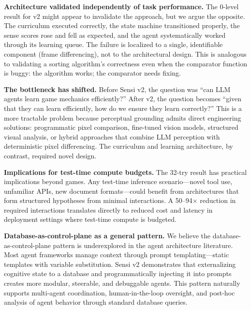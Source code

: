 \documentclass[11pt,letterpaper]{article}
\begin{document}
\textbf{Architecture validated independently of task performance.} The 0-level result for v2 might appear to invalidate the approach, but we argue the opposite. The curriculum executed correctly, the state machine transitioned properly, the sense scores rose and fell as expected, and the agent systematically worked through its learning queue. The failure is localized to a single, identifiable component (frame differencing), not to the architectural design. This is analogous to validating a sorting algorithm's correctness even when the comparator function is buggy: the algorithm works; the comparator needs fixing.

\textbf{The bottleneck has shifted.} Before Sensi v2, the question was ``can LLM agents learn game mechanics efficiently?'' After v2, the question becomes ``given that they can learn efficiently, how do we ensure they learn correctly?'' This is a more tractable problem because perceptual grounding admits direct engineering solutions: programmatic pixel comparison, fine-tuned vision models, structured visual analysis, or hybrid approaches that combine LLM perception with deterministic pixel differencing. The curriculum and learning architecture, by contrast, required novel design.

\textbf{Implications for test-time compute budgets.} The 32-try result has practical implications beyond games. Any test-time inference scenario---novel tool use, unfamiliar APIs, new document formats---could benefit from architectures that form structured hypotheses from minimal interactions. A 50--94$\times$ reduction in required interactions translates directly to reduced cost and latency in deployment settings where test-time compute is budgeted.

\textbf{Database-as-control-plane as a general pattern.} We believe the database-as-control-plane pattern is underexplored in the agent architecture literature. Most agent frameworks manage context through prompt templating---static templates with variable substitution. Sensi v2 demonstrates that externalizing cognitive state to a database and programmatically injecting it into prompts creates more modular, steerable, and debuggable agents. This pattern naturally supports multi-agent coordination, human-in-the-loop oversight, and post-hoc analysis of agent behavior through standard database queries.


\end{document}
